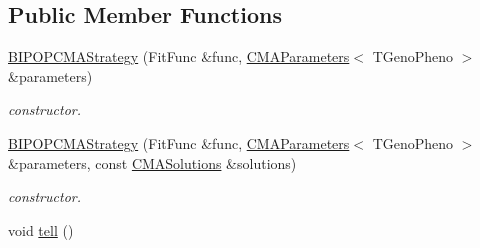 \subsection*{Public Member Functions}
\begin{DoxyCompactItemize}
\item 
\hyperlink{classlibcmaes_1_1BIPOPCMAStrategy_a4c693467ab661f639e2fe2120dabcc6e}{B\+I\+P\+O\+P\+C\+M\+A\+Strategy} (Fit\+Func \&func, \hyperlink{classlibcmaes_1_1CMAParameters}{C\+M\+A\+Parameters}$<$ T\+Geno\+Pheno $>$ \&parameters)
\begin{DoxyCompactList}\small\item\em constructor. \end{DoxyCompactList}\item 
\hyperlink{classlibcmaes_1_1BIPOPCMAStrategy_a33ea94936c2a70c54d4b2e48f04f803f}{B\+I\+P\+O\+P\+C\+M\+A\+Strategy} (Fit\+Func \&func, \hyperlink{classlibcmaes_1_1CMAParameters}{C\+M\+A\+Parameters}$<$ T\+Geno\+Pheno $>$ \&parameters, const \hyperlink{classlibcmaes_1_1CMASolutions}{C\+M\+A\+Solutions} \&solutions)
\begin{DoxyCompactList}\small\item\em constructor. \end{DoxyCompactList}\item 
\hypertarget{classlibcmaes_1_1BIPOPCMAStrategy_adc3f5ef544a151efeb96e4d4c83e1858}{void \hyperlink{classlibcmaes_1_1BIPOPCMAStrategy_adc3f5ef544a151efeb96e4d4c83e1858}{tell} ()}\label{classlibcmaes_1_1BIPOPCMAStrategy_adc3f5ef544a151efeb96e4d4c83e1858}


\end{DoxyCompactItemize}
